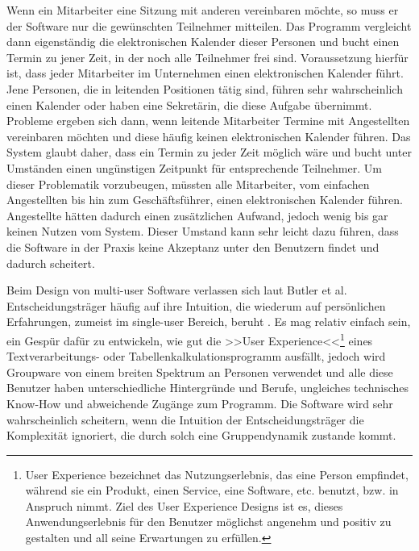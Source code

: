 Wenn ein Mitarbeiter eine Sitzung mit anderen vereinbaren möchte, so muss er der Software nur die gewünschten Teilnehmer mitteilen. Das Programm vergleicht dann eigenständig die elektronischen Kalender dieser Personen und bucht einen Termin zu jener Zeit, in der noch alle Teilnehmer frei sind. Voraussetzung hierfür ist, dass jeder Mitarbeiter im Unternehmen einen elektronischen Kalender führt. Jene Personen, die in leitenden Positionen tätig sind, führen sehr wahrscheinlich einen Kalender oder haben eine Sekretärin, die diese Aufgabe übernimmt. Probleme ergeben sich dann, wenn leitende Mitarbeiter Termine mit Angestellten vereinbaren möchten und diese häufig keinen elektronischen Kalender führen. Das System glaubt daher, dass ein Termin zu jeder Zeit möglich wäre und bucht unter Umständen einen ungünstigen Zeitpunkt für entsprechende Teilnehmer.  Um dieser Problematik vorzubeugen, müssten alle Mitarbeiter, vom einfachen Angestellten bis hin zum Geschäftsführer, einen elektronischen Kalender führen. Angestellte hätten dadurch einen zusätzlichen Aufwand, jedoch wenig bis gar keinen Nutzen vom System. Dieser Umstand kann sehr leicht dazu führen, dass die Software in der Praxis keine Akzeptanz unter den Benutzern findet und dadurch scheitert.

\medskip Beim Design von multi-user Software verlassen sich laut Butler et al. Entscheidungsträger häufig auf ihre Intuition, die wiederum auf persönlichen Erfahrungen, zumeist im single-user Bereich, beruht \citep{ButlerK:1987}. Es mag relativ einfach sein, ein Gespür dafür zu entwickeln, wie gut die >>User Experience<<\footnote{User Experience bezeichnet das Nutzungserlebnis, das eine Person empfindet, während sie ein Produkt, einen Service, eine Software, etc. benutzt, bzw. in Anspruch nimmt. Ziel des User Experience Designs ist es, dieses Anwendungserlebnis für den Benutzer möglichst angenehm und positiv zu gestalten und all seine Erwartungen zu erfüllen.} eines Textverarbeitungs- oder Tabellenkalkulationsprogramm ausfällt, jedoch wird Groupware von einem breiten Spektrum an Personen verwendet und alle diese Benutzer haben unterschiedliche Hintergründe und Berufe, ungleiches technisches Know-How und abweichende Zugänge zum Programm. Die Software wird sehr wahrscheinlich scheitern, wenn die Intuition der Entscheidungsträger die Komplexität ignoriert, die durch solch eine Gruppendynamik zustande kommt. 

